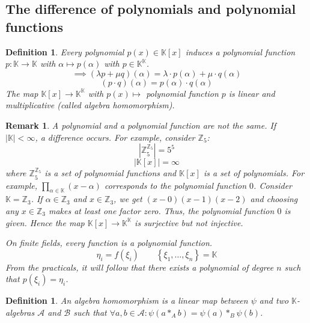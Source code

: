 \documentclass[a4paper]{article}
\newcounter{lecref}[section]
\numberwithin{lecref}{section}
\newtheorem{definition}[lecref]{Definition}
\newtheorem{remark}[lecref]{Remark}
\newcommand{\set}[1]{\left\{#1\right\}}
\newcommand{\card}[1]{\left|#1\right|}
\begin{document}
\subsection{The difference of polynomials and polynomial functions}

\begin{definition} %
  Every polynomial $p(x) \in \mathbb K[x]$ induces a polynomial function $p: \mathbb K \to \mathbb K$ with $\alpha \mapsto p(\alpha)$
  with $p \in \mathbb K^{\mathbb K}$.
  \[ \implies (\lambda p + \mu q) (\alpha) = \lambda \cdot p(\alpha) + \mu \cdot q(\alpha) \]
  \[ (p \cdot q)(\alpha) = p(\alpha) \cdot q(\alpha) \]
  The map $\mathbb K[x] \to \mathbb K^{\mathbb K}$ with $p(x) \mapsto$ polynomial function $p$
  is linear and multiplicative (called \emph{algebra homomorphism}).
\end{definition}

\begin{remark} %
  A polynomial and a polynomial function are not the same.
  If $\card{\mathbb K} < \infty$, a difference occurs.
  For example, consider $\mathbb Z_5$:
  \[ \card{\mathbb Z_5^{\mathbb Z_5}} = 5^5 \]
  \[ \card{\mathbb K[x]} = \infty \]
  where $\mathbb Z_5^{\mathbb Z_5}$ is a set of polynomial functions and $\mathbb K[x]$ is a set of polynomials.
  For example, $\prod_{\alpha \in \mathbb K}(x - \alpha)$ corresponds to the polynomial function $0$.
  Consider $\mathbb K = \mathbb Z_3$. If $\alpha \in \mathbb Z_3$ and $x \in \mathbb Z_3$, we get $(x - 0)(x - 1)(x - 2)$
  and choosing any $x \in \mathbb Z_3$ makes at least one factor zero. Thus, the polynomial function $0$ is given.
  Hence the map $\mathbb K[x] \to \mathbb K^{\mathbb K}$ is surjective but not injective.

  On finite fields, every function is a polynomial function.
  \[ \eta_i = f(\xi_i) \qquad \set{\xi_1, \dots, \xi_n} = \mathbb K \]
  From the practicals, it will follow that there exists a polynomial of degree $n$ such that $p(\xi_i) = \eta_i$.
\end{remark}

\begin{definition} %
  An algebra homomorphism is a linear map between $\psi$ and two $\mathbb K$-algebras $\mathcal A$ and $\mathcal B$ such that
  $\forall a,b \in \mathcal A: \psi(a *_A b) = \psi(a) *_B \psi(b)$.
\end{definition}
\end{document}
